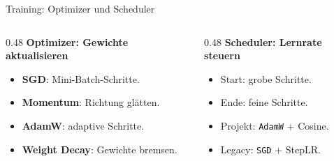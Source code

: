 \begin{frame}{Training: Optimizer und Scheduler}
\scriptsize
\begin{columns}[T,onlytextwidth]
\begin{column}{0.48\textwidth}
\textbf{Optimizer: Gewichte aktualisieren}
\begin{itemize}\setlength\itemsep{0.06em}
    \item \textbf{SGD}: Mini-Batch-Schritte.
    \item \textbf{Momentum}: Richtung glätten.
    \item \textbf{AdamW}: adaptive Schritte.
    \item \textbf{Weight Decay}: Gewichte bremsen.
\end{itemize}
\end{column}
\begin{column}{0.48\textwidth}
\textbf{Scheduler: Lernrate steuern}
\begin{itemize}\setlength\itemsep{0.06em}
    \item Start: grobe Schritte.
    \item Ende: feine Schritte.
    \item Projekt: \texttt{AdamW} + Cosine.
    \item Legacy: \texttt{SGD} + StepLR.
\end{itemize}
\end{column}
\end{columns}
\end{frame}
